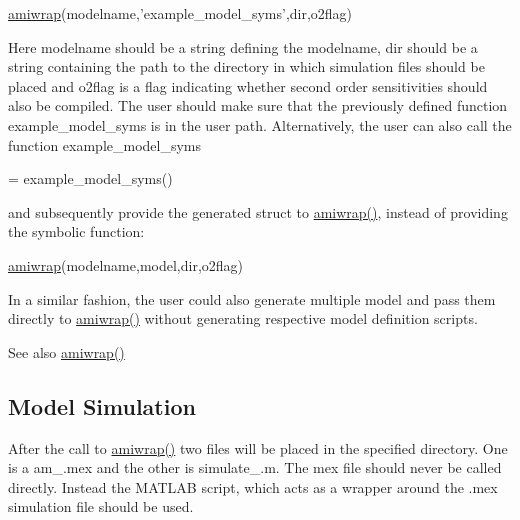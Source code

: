 \begin{DoxyCode}
\hyperlink{amiwrap_8m_a183dd11adc4bd525147faa2590ea325b}{amiwrap}(modelname,\textcolor{stringliteral}{'example\_model\_syms'},dir,o2flag)
\end{DoxyCode}


Here modelname should be a string defining the modelname, dir should be a string containing the path to the directory in which simulation files should be placed and o2flag is a flag indicating whether second order sensitivities should also be compiled. The user should make sure that the previously defined function \textquotesingle{}example\+\_\+model\+\_\+syms\textquotesingle{} is in the user path. Alternatively, the user can also call the function \textquotesingle{}example\+\_\+model\+\_\+syms\textquotesingle{}


\begin{DoxyCode}
[model] = example\_model\_syms() 
\end{DoxyCode}


and subsequently provide the generated struct to \hyperlink{amiwrap_8m_a183dd11adc4bd525147faa2590ea325b}{amiwrap()}, instead of providing the symbolic function\+:


\begin{DoxyCode}
\hyperlink{amiwrap_8m_a183dd11adc4bd525147faa2590ea325b}{amiwrap}(modelname,model,dir,o2flag)
\end{DoxyCode}


In a similar fashion, the user could also generate multiple model and pass them directly to \hyperlink{amiwrap_8m_a183dd11adc4bd525147faa2590ea325b}{amiwrap()} without generating respective model definition scripts.

\begin{DoxySeeAlso}{See also}
\hyperlink{amiwrap_8m_a183dd11adc4bd525147faa2590ea325b}{amiwrap()}
\end{DoxySeeAlso}
\hypertarget{def_simu_simulation}{}\subsection{Model Simulation}\label{def_simu_simulation}
After the call to \hyperlink{amiwrap_8m_a183dd11adc4bd525147faa2590ea325b}{amiwrap()} two files will be placed in the specified directory. One is a am\+\_.mex and the other is simulate\+\_.m. The mex file should never be called directly. Instead the M\+A\+T\+L\+A\+B script, which acts as a wrapper around the .mex simulation file should be used.


